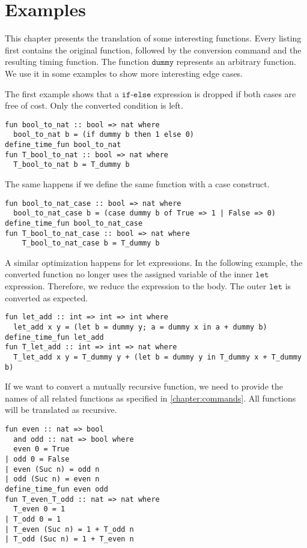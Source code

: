 
\section{Examples}
This chapter presents the translation of some interesting functions.
Every listing first contains the original function, followed by the conversion command and the resulting timing function.
The function $\texttt{dummy}$ represents an arbitrary function.
We use it in some examples to show more interesting edge cases.

The first example shows that a $\texttt{if-else}$ expression is dropped if both cases are free of cost.
Only the converted condition is left.
\begin{lstlisting}[language=isabelle,mathescape=true]
fun bool_to_nat :: bool => nat where
  bool_to_nat b = (if dummy b then 1 else 0)
define_time_fun bool_to_nat
fun T_bool_to_nat :: bool => nat where
  T_bool_to_nat b = T_dummy b
\end{lstlisting}

The same happens if we define the same function with a case construct.
\begin{lstlisting}[language=isabelle,mathescape=true]
fun bool_to_nat_case :: bool => nat where
  bool_to_nat_case b = (case dummy b of True => 1 | False => 0)
define_time_fun bool_to_nat_case
fun T_bool_to_nat_case :: bool => nat where
    T_bool_to_nat_case b = T_dummy b
\end{lstlisting}

A similar optimization happens for let expressions.
In the following example, the converted function no longer uses the assigned variable of the inner $\texttt{let}$ expression.
Therefore, we reduce the expression to the body.
The outer $\texttt{let}$ is converted as expected.
\begin{lstlisting}[language=isabelle,mathescape=true]
fun let_add :: int => int => int where
  let_add x y = (let b = dummy y; a = dummy x in a + dummy b)
define_time_fun let_add
fun T_let_add :: int => int => nat where
  T_let_add x y = T_dummy y + (let b = dummy y in T_dummy x + T_dummy b)
\end{lstlisting}

If we want to convert a mutually recursive function, we need to provide the names of all related functions as specified in \autoref{chapter:commands}.
All functions will be translated as recursive.
\begin{lstlisting}[language=isabelle,mathescape=true]
fun even :: nat => bool
  and odd :: nat => bool where
  even 0 = True
| odd 0 = False
| even (Suc n) = odd n
| odd (Suc n) = even n
define_time_fun even odd
fun T_even_T_odd :: nat => nat where
  T_even 0 = 1
| T_odd 0 = 1
| T_even (Suc n) = 1 + T_odd n
| T_odd (Suc n) = 1 + T_even n
\end{lstlisting}

